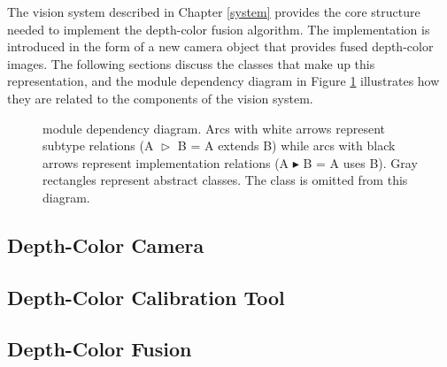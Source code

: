 The vision system described in Chapter \ref{system} provides the core structure needed to implement the 
depth-color fusion algorithm. The implementation is introduced in the form of a new camera object that 
provides fused depth-color images. The following sections discuss the classes that make up this 
representation, and the module dependency diagram in Figure \ref{depthcolorcammoduledependency} 
illustrates how they are related to the components of the vision system.

\begin{figure}[t]
\begin{center}

\caption[\DepthColorCam{}'s module dependency diagram]{\DepthColorCam{} module dependency diagram. 
Arcs with white arrows represent subtype relations (A $\vartriangleright$ B = A extends B) while arcs with 
black arrows represent implementation relations (A $\blacktriangleright$ B = A uses B). Gray rectangles 
represent abstract classes. The \ImageBuffer{} class is omitted from this diagram.}
\label{depthcolorcammoduledependency}
\end{center}
\end{figure}

	\subsection{Depth-Color Camera} \label{depthcolorcam}
	
	
	\subsection{Depth-Color Calibration Tool} \label{depthcolorcalibrationtool}
	
	
	\subsection{Depth-Color Fusion} \label{depthcolorfusion}
	



